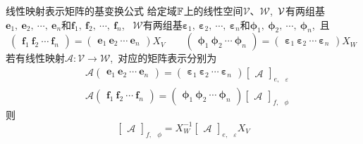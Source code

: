 \documentclass[10pt, a4paper, oneside, fontset=none]{ctexart}
\theoremstyle{plain}
\theoremstyle{definition}
\newcommand{\com}{,\,\,\,\:}
\newcommand{\di}[2][]{\begin{theo}{#1}\run #2\end{theo}}
\begin{document}
\di[线性映射表示矩阵的基变换公式]{
    给定域$\mathbb{F}$上的线性空间$\mathcal{V}$、$\mathcal{W}$\com $\mathcal{V}$有两组基$\boldsymbol{e}_1,~\boldsymbol{e}_2,~\cdots,~\boldsymbol{e}_n$和$\boldsymbol{f}_1,~\boldsymbol{f}_2,~\cdots,~\boldsymbol{f}_n$\com 
    $\mathcal{W}$有两组基$\boldsymbol{\varepsilon}_1,~\boldsymbol{\varepsilon}_2,~\cdots,~\boldsymbol{\varepsilon}_n$和$\boldsymbol{\phi}_1,~\boldsymbol{\phi}_2,~\cdots,~\boldsymbol{\phi}_n$\com 且 
    $$
    \begin{pmatrix}
        \boldsymbol{f}_1~\boldsymbol{f}_2~\cdots~\boldsymbol{f}_n
    \end{pmatrix}=\begin{pmatrix}
        \boldsymbol{e}_1~\boldsymbol{e}_2~\cdots~\boldsymbol{e}_n
    \end{pmatrix}X_V
    \qquad
    \begin{pmatrix}
        \boldsymbol{\phi}_1~\boldsymbol{\phi}_2~\cdots~\boldsymbol{\phi}_n
    \end{pmatrix}=\begin{pmatrix}
        \boldsymbol{\varepsilon}_1~\boldsymbol{\varepsilon}_2~\cdots~\boldsymbol{\varepsilon}_n
    \end{pmatrix}X_W
    $$
    若有线性映射$\mathscr{A}:\mathcal{V}\to \mathcal{W}$\com 对应的矩阵表示分别为
    \begin{align*} 
        &\mathscr{A}\begin{pmatrix}
            \boldsymbol{e}_1~\boldsymbol{e}_2~\cdots~\boldsymbol{e}_n
        \end{pmatrix}=\begin{pmatrix}
            \boldsymbol{\varepsilon}_1~\boldsymbol{\varepsilon}_2~\cdots~\boldsymbol{\varepsilon}_n
        \end{pmatrix}\begin{bmatrix} \mathscr{A} \end{bmatrix}_{e\com \varepsilon}
        \\
        &\mathscr{A}\begin{pmatrix}
            \boldsymbol{f}_1~\boldsymbol{f}_2~\cdots~\boldsymbol{f}_n
        \end{pmatrix}=\begin{pmatrix}
            \boldsymbol{\phi}_1~\boldsymbol{\phi}_2~\cdots~\boldsymbol{\phi}_n
        \end{pmatrix}\begin{bmatrix} \mathscr{A} \end{bmatrix}_{f\com \phi}
    \end{align*}
    则$$\begin{bmatrix} \mathscr{A} \end{bmatrix}_{f\com \phi}=X_W^{-1}\begin{bmatrix} \mathscr{A} \end{bmatrix}_{e\com \varepsilon}X_V$$
}
\end{document}

